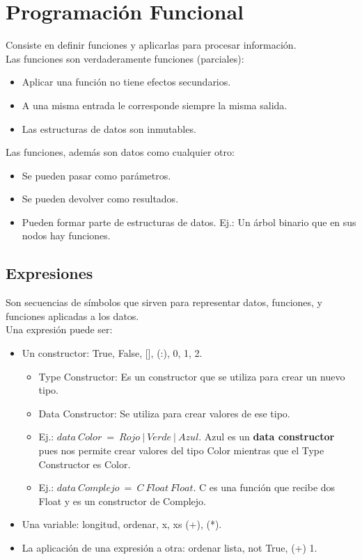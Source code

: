 \documentclass[10pt,a4paper]{article}
\begin{document}
\section*{Programación Funcional}
Consiste en definir funciones y aplicarlas para procesar información. \\
Las funciones son verdaderamente funciones (parciales): 
\begin{itemize}
    \item Aplicar una función no tiene efectos secundarios.
    \item A una misma entrada le corresponde siempre la misma salida.
    \item Las estructuras de datos son inmutables.
\end{itemize}
Las funciones, además son datos como cualquier otro:
\begin{itemize}
    \item Se pueden pasar como parámetros.
    \item Se pueden devolver como resultados.
    \item Pueden formar parte de estructuras de datos. Ej.: Un árbol binario que en sus nodos hay funciones.
\end{itemize}
\subsection*{Expresiones}
Son secuencias de símbolos que sirven para representar datos, funciones, y funciones aplicadas a los datos. \\
Una expresión puede ser:
\begin{itemize}
    \item Un constructor: True, False, [], (:), 0, 1, 2. 
    \begin{itemize}
        \item Type Constructor: Es un constructor que se utiliza para crear un nuevo tipo.
        \item Data Constructor: Se utiliza para crear valores de ese tipo.
        \item Ej.: $data \ Color \ = \ Rojo \ | \ Verde \ | \ Azul$. Azul es un \textbf{data constructor} pues nos permite crear valores del tipo Color mientras que el Type Constructor es Color.
        \item Ej.: $data \ Complejo \ = \ C \ Float \ Float $. C es una función que recibe dos Float y es un constructor de Complejo.
    \end{itemize}
    \item Una variable: longitud, ordenar, x, xs (+), (*). 
    \item La aplicación de una expresión a otra: ordenar lista, not True, (+) 1. 
\end{itemize}
\end{document}

